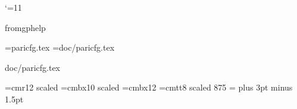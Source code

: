 %
%

\catcode`\@=11
%
%
\newif\ifGPHELP
\newif\ifPDF
\newread\std
\def\checkfile#1{\def\@stdfile{#1}\openin\std=#1\relax}
\long\def\@ifundef#1#2#3{\expandafter\ifx\csname
  #1\endcsname\relax#2\else#3\fi}

\@ifundef{fromgphelp}{\GPHELPfalse}{\GPHELPtrue}
\ifGPHELP %
  \overfullrule=0pt
\else     %
  \magnification=\magstephalf
  \ifx\pdfoutput\undefined
     \PDFfalse
  \else
     \PDFtrue
  \fi
\fi

\checkfile{paricfg.tex}
\ifeof\std
  \checkfile{doc/paricfg.tex}
\fi
\ifeof\std
  \ifGPHELP\else%
    \message{paricfg.tex not found. You should run Configure.}
  \fi
  \def\vers{2.0.x}
  \def\includedir{/usr/local/include/pari}
  \def\libdir{/usr/local/lib}
\else
  \@stdfile
\fi

\font\chaptertitlefont=cmr12 scaled 
\font\chaptertitlebf=cmbx10 scaled 
\font\sectiontitlebf=cmbx12
\font\seventt=cmtt8 scaled 875
\scriptfont\ttfam=\seventt %
\parskip=6pt plus 3pt minus 1.5pt

\newwrite\toc
\def\tableofcontents{\begintitle
\openin\std=\jobname.toc
\ifeof\std
\else
  \begingroup
  \centerline{\bf Table of Contents}\medskip
  \parskip=0pt plus 1pt
  \parindent=0pt
  \catcode`\_=11 %
  \catcode`\@=11 %
  \obeylines\jobname.toc
  \endgroup
\fi
\openout\toc=\jobname.toc
\endtitle}

\newif\ifsecondpass
\newwrite\out
\newwrite\aux
\newwrite\index
\ifGPHELP %
  \def\condwrite#1#2{}
  \def\idx#1{#1}
  \def\toindex#1{}
  \def\tocwrite#1{}
  \def\label#1{}
  \def\gphelpref#1{[Label: {\tt #1}]}
  \def\gphelpsecref#1{Section~\gphelpref{#1}}
  \def\ref{\let\do=\gphelpref\doverb}
  \def\secref{\let\do=\gphelpsecref\doverb}
\else %
  \def\typeout#1{\immediate\write\out{#1}}
  \def\@namedef#1{\expandafter\def\csname#1\endcsname}
  \def\newlabel#1#2{\@ifundef{r@#1}{}{\message{Label `#1' multiply
    defined}}\global\@namedef{r@#1}{#2}}

